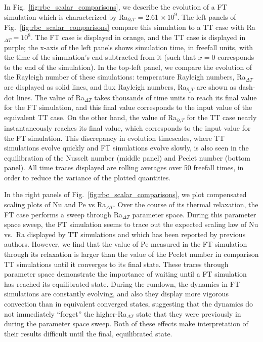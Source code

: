 \documentclass[aps, pre, onecolumn, nofootinbib, notitlepage, groupedaddress, amsfonts, amssymb, amsmath, longbibliography, superscriptaddress]{revtex4-1}
\begin{document}
In Fig.~\ref{fig:rbc_scalar_comparisons}, we describe the evolution of a FT simulation which is characterized by Ra$_{\partial_z T}$ = 2.61$\,\times 10^9$.
The left panels of Fig.~\ref{fig:rbc_scalar_comparisons} compare this simulation to a TT case with Ra$_{\Delta T} = 10^8$.
The FT case is displayed in orange, and the TT case is displayed in purple; the x-axis of the left panels shows simulation time, in freefall units, with the time of the simulation's end subtracted from it (such that $x = 0$ corresponds to the end of the simulation).
In the top-left panel, we compare the evolution of the Rayleigh number of these simulations: temperature Rayleigh numbers, Ra$_{\Delta T}$ are displayed as solid lines, and flux Rayleigh numbers, Ra$_{\partial_z T}$ are shown as dash-dot lines.
The value of Ra$_{\Delta T}$ takes thousands of time units to reach its final value for the FT simulation, and this final value corresponds to the input value of the equivalent TT case.
On the other hand, the value of Ra$_{\partial_z T}$ for the TT case nearly instantaneously reaches its final value, which corresponds to the input value for the FT simulation.
This discrepancy in evolution timescales, where TT simulations evolve quickly and FT simulations evolve slowly, is also seen in the equilibration of the Nusselt number (middle panel) and Peclet number (bottom panel).
All time traces displayed are rolling averages over 50 freefall times, in order to reduce the variance of the plotted quantities.

In the right panels of Fig.~\ref{fig:rbc_scalar_comparisons}, we plot compensated scaling plots of Nu and Pe vs Ra$_{\Delta T}$.
Over the course of its thermal relaxation, the FT case performs a sweep through Ra$_{\Delta T}$ parameter space.
During this parameter space sweep, the FT simulation seems to trace out the expected scaling law of Nu vs.~Ra displayed by TT simulations and which has been reported by previous authors.
However, we find that the value of Pe measured in the FT simulation through its relaxation  is larger than the value of the Peclet number in comparison TT simulations until it converges to its final state.
These traces through parameter space demonstrate the importance of waiting until a FT simulation has reached its equilibrated state.
During the rundown, the dynamics in FT simulations are constantly evolving, and also they display more vigorous convection than in equivalent converged states, suggesting that the dynamics do not immediately ``forget'' the higher-Ra$_{\Delta T}$ state that they were previously in during the parameter space sweep.
Both of these effects make interpretation of their results difficult until the final, equilibrated state.
\end{document}
